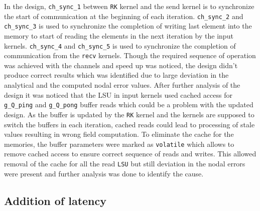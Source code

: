In the design, \texttt{ch\_sync\_1} between \texttt{RK} kernel and the send kernel is to synchronize
the start of communication at the beginning of each iteration. \texttt{ch\_sync\_2} and
\texttt{ch\_sync\_3} is used to synchronize the completion of writing last element into
the memory to start of reading the elements in the next iteration by the input kernels.
\texttt{ch\_sync\_4} and \texttt{ch\_sync\_5} is used to synchronize the completion
of communication from the \texttt{recv} kernels. Though the required sequence of operation
was achieved with the channels and speed up was noticed, the design didn't produce correct
results which was identified due to large deviation in the analytical and the computed
nodal error values. After further analysis of the design it was noticed that the
\acl{LSU} in input kernels used cached access for \texttt{g\_Q\_ping} and \texttt{g\_Q\_pong}
buffer reads which could be a problem with the updated design. As the buffer is updated by the
\texttt{RK} kernel and the kernels are supposed to switch the buffers in each iteration, cached reads
could lead to processing of stale values resulting in wrong field computation. To eliminate
the cache for the memories, the buffer parameters were marked as \texttt{volatile} which allows
to remove cached access \cite{noauthor_intel_2019_best,section 2.8.7} to ensure correct sequence of
reads and writes. This allowed removal
of the cache for all the read \texttt{LSU} but still deviation in the nodal errors were
present and further analysis was done to identify the cause.

\subsection*{Addition of latency}
\label{sec:add_latency}

